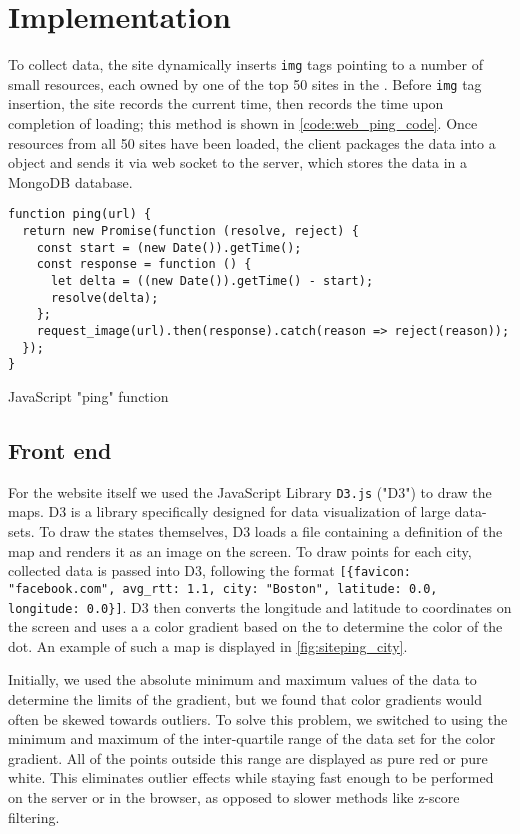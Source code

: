 \section{Implementation}\label{sec:web_ping_impl}

To collect data, the site dynamically inserts \html \texttt{img} tags pointing to a number of small resources, each owned by one of the top 50 sites in the \us. Before \texttt{img} tag insertion, the site records the current time, then records the time upon completion of loading; this method is shown in \cref{code:web_ping_code}. Once resources from all 50 sites have been loaded, the client packages the data into a \json object and sends it via web socket to the server, which stores the data in a MongoDB database. 

\begin{code}[h]
    \centering
    \small
    \begin{verbatim}
function ping(url) {
  return new Promise(function (resolve, reject) {
    const start = (new Date()).getTime();
    const response = function () {
      let delta = ((new Date()).getTime() - start);
      resolve(delta);
    };
    request_image(url).then(response).catch(reason => reject(reason));
  });
}
    \end{verbatim}
    \caption{JavaScript "ping" function}
    \label{code:web_ping_code}
\end{code}

\subsection{Front end}

For the website itself we used the JavaScript Library \texttt{D3.js} ("D3") to draw the maps. D3 is a library specifically designed for data visualization of large data-sets. To draw the states themselves, D3 loads a \json file containing a definition of the map and renders it as an \svg image on the screen. To draw points for each city, collected data is passed into D3, following the format \texttt{\small [\{favicon: "facebook.com", avg\_rtt: 1.1, city: "Boston", latitude: 0.0, longitude: 0.0\}]}. D3 then converts the longitude and latitude to coordinates on the screen and uses a a color gradient based on the \rtt to determine the color of the dot. An example of such a map is displayed in \cref{fig:siteping_city}.

Initially, we used the absolute minimum and maximum values of the data to determine the limits of the gradient, but we found that color gradients would often be skewed towards outliers. To solve this problem, we switched to using the minimum and maximum of the inter-quartile range of the data set for the color gradient. All of the points outside this range are displayed as pure red or pure white. This eliminates outlier effects while staying fast enough to be performed on the server or in the browser, as opposed to slower methods like z-score filtering.

